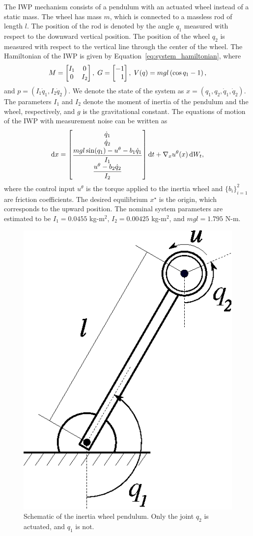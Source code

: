 The IWP mechanism consists of a pendulum with an actuated wheel instead of a static
mass.
%
The wheel has mass $m$, which is connected to a massless rod of length \(l\). 
%
The position of the rod is denoted by the angle \(q_1\) measured with
respect to the downward vertical position.
%
The position of the wheel \(q_2\) is measured with respect to the vertical
line through the center of the wheel.
%
The Hamiltonian of the IWP is given by Equation~\eqref{eq:system_hamiltonian}, where
%
\begin{equation*}
    M = \begin{bmatrix}I_1 & 0 \\ 0 & I_2\end{bmatrix},
    \;
    G = \begin{bmatrix}-1 \\ \phantom{-}1\end{bmatrix},
    \;
    V(q) = mgl \left( \cos q_1 - 1 \right),
\end{equation*}
%
and $p = \left(I_1 \dot{q}_1,I_2 \dot{q}_2\right)$. 
%
We denote the state of the system as $x = (q_1, q_2, \dot{q}_1, \dot{q}_2)$.
%
The parameters \(I_1\) and \(I_2\) denote the moment of inertia of the pendulum
and the wheel, respectively, and \(g\) is the gravitational constant.
%
The equations of motion of the IWP with measurement noise can be written as 
%
\begin{equation}
    \operatorname{d}\! x = \begin{bmatrix}\dot{q}_1 \\ \dot{q}_2 \\ \dfrac{mgl \sin(q_1) - u^\theta - b_1\dot{q}_1}{I_1} \\ \dfrac{u^\theta - b_2 \dot{q}_2}{I_2}\end{bmatrix} \operatorname{d}\! t + \nabla_x u^\theta(x) \operatorname{d}\! W_t, 
    \label{eq:iwp_dynamics}
\end{equation}
%
where the control input \(u^\theta\) is the torque applied to the inertia wheel
and $\{b_i\}_{i=1}^2$ are friction coefficients.
%
The desired equilibrium $x^\star$ is the origin, which corresponds to the upward
position.
%
The nominal system parameters are estimated to be $I_1 = 0.0455$ kg-m$^2$, $I_2
= 0.00425$ kg-m$^2$, and $mgl = 1.795$ N-m. 
%
%

\begin{figure}[t]
    \centering
    \includegraphics[width=0.25\linewidth]{figures/iwp.eps}
    \caption{Schematic of the inertia wheel pendulum. Only the joint $q_2$ is actuated, and $q_1$ is not.}
    \label{fig:iwp}
\end{figure}

